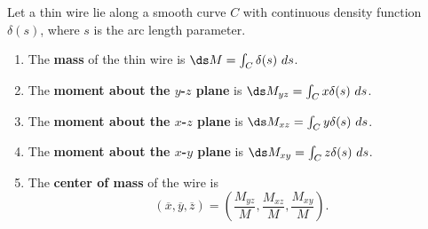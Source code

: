 {Let a thin wire lie along a smooth curve $C$ with continuous density function $\delta(s)$, where $s$ is the arc length parameter. 
\begin{enumerate}
	\item The \textbf{mass} of the thin wire is $\ds M = \int_C \delta(s)\ ds$.
	\item	The \textbf{moment about the $y$-$z$ plane} is $\ds M_{yz} = \int_C x\delta(s)\ ds$.
	
	\item	The \textbf{moment about the $x$-$z$ plane} is $\ds M_{xz} = \int_C y\delta(s)\ ds$.
	\item	The \textbf{moment about the $x$-$y$ plane} is $\ds M_{xy} = \int_C z\delta(s)\ ds$.
	\item The \textbf{center of mass} of the wire is $$(\overline{x},\overline{y},\overline{z}) = \left(\frac{M_{yz}}M, \frac{M_{xz}}M,\frac{M_{xy}}M\right).$$
\end{enumerate}
}

